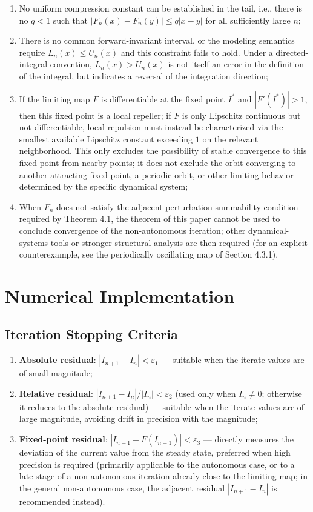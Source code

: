 \documentclass[11pt,a4paper]{amsart}
\begin{document}
\begin{enumerate}
\item No uniform compression constant can be established in the tail, i.e., there is no $q < 1$ such that $|F_n(x) - F_n(y)| \le q|x - y|$ for all sufficiently large $n$;
\item There is no common forward-invariant interval, or the modeling semantics require $L_n(x) \le U_n(x)$ and this constraint fails to hold. Under a directed-integral convention, $L_n(x) > U_n(x)$ is not itself an error in the definition of the integral, but indicates a reversal of the integration direction;
\item If the limiting map $F$ is differentiable at the fixed point $I^*$ and $|F'(I^*)| > 1$, then this fixed point is a local repeller; if $F$ is only Lipschitz continuous but not differentiable, local repulsion must instead be characterized via the smallest available Lipschitz constant exceeding $1$ on the relevant neighborhood. This only excludes the possibility of stable convergence to this fixed point from nearby points; it does not exclude the orbit converging to another attracting fixed point, a periodic orbit, or other limiting behavior determined by the specific dynamical system;
\item When $F_n$ does not satisfy the adjacent-perturbation-summability condition required by Theorem 4.1, the theorem of this paper cannot be used to conclude convergence of the non-autonomous iteration; other dynamical-systems tools or stronger structural analysis are then required (for an explicit counterexample, see the periodically oscillating map of Section 4.3.1).
\end{enumerate}

\section{Numerical Implementation}

\subsection{Iteration Stopping Criteria}

\begin{enumerate}
\item \textbf{Absolute residual}: $|I_{n+1} - I_n| < \varepsilon_1$ --- suitable when the iterate values are of small magnitude;
\item \textbf{Relative residual}: $|I_{n+1} - I_n|/|I_n| < \varepsilon_2$ (used only when $I_n \ne 0$; otherwise it reduces to the absolute residual) --- suitable when the iterate values are of large magnitude, avoiding drift in precision with the magnitude;
\item \textbf{Fixed-point residual}: $|I_{n+1} - F(I_{n+1})| < \varepsilon_3$ --- directly measures the deviation of the current value from the steady state, preferred when high precision is required (primarily applicable to the autonomous case, or to a late stage of a non-autonomous iteration already close to the limiting map; in the general non-autonomous case, the adjacent residual $|I_{n+1} - I_n|$ is recommended instead).
\end{enumerate}
\end{document}
